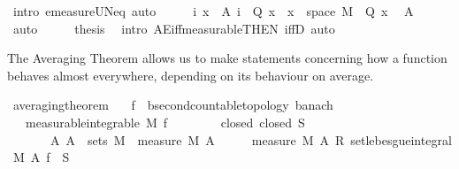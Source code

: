 \begin{isabellebody}
\ {\isacharparenleft}{\kern0pt}intro\ emeasure{\isacharunderscore}{\kern0pt}UN{\isacharunderscore}{\kern0pt}eq{\isacharunderscore}{\kern0pt}{}{\isacharcomma}{\kern0pt}\ auto{\isacharparenright}{\kern0pt}\isanewline
\ \ \isamarkupfalse%
\ \isamarkupfalse%
\ {\isachardoublequoteopen}{\isacharparenleft}{\kern0pt}{\isasymUnion}i{\isachardot}{\kern0pt}\ {\isacharbraceleft}{\kern0pt}x\ {\isasymin}\ A\ i{\isachardot}{\kern0pt}\ {\isasymnot}\ Q\ x{\isacharbraceright}{\kern0pt}{\isacharparenright}{\kern0pt}\ {\isacharequal}{\kern0pt}\ {\isacharbraceleft}{\kern0pt}x\ {\isasymin}\ space\ M{\isachardot}{\kern0pt}\ {\isasymnot}\ Q\ x{\isacharbraceright}{\kern0pt}{\isachardoublequoteclose}\ \isamarkupfalse%
\ A\ \isamarkupfalse%
\ auto\isanewline
\ \ \isamarkupfalse%
\ \isamarkupfalse%
\ {\isacharquery}{\kern0pt}thesis\ \isamarkupfalse%
\ {\isacharparenleft}{\kern0pt}intro\ AE{\isacharunderscore}{\kern0pt}iff{\isacharunderscore}{\kern0pt}measurable{\isacharbrackleft}{\kern0pt}THEN\ iffD{}{\isacharbrackright}{\kern0pt}{\isacharcomma}{\kern0pt}\ auto{\isacharparenright}{\kern0pt}\isanewline
{}\isamarkupfalse%
%
\endisatagproof
{\isafoldproof}%
%
\isadelimproof
%
\endisadelimproof
%
\begin{isamarkuptext}%
The Averaging Theorem allows us to make statements concerning how a function behaves almost everywhere, depending on its behaviour on average.%
\end{isamarkuptext}\isamarkuptrue%
\isamarkupfalse%
\ averaging{\isacharunderscore}{\kern0pt}theorem{\isacharcolon}{\kern0pt}\isanewline
\ \ \ f{\isacharcolon}{\kern0pt}{\isacharcolon}{\kern0pt}{\isachardoublequoteopen}{\isacharunderscore}{\kern0pt}\ {\isasymRightarrow}\ {\isacharprime}{\kern0pt}b{\isacharcolon}{\kern0pt}{\isacharcolon}{\kern0pt}{\isacharbraceleft}{\kern0pt}second{\isacharunderscore}{\kern0pt}countable{\isacharunderscore}{\kern0pt}topology{\isacharcomma}{\kern0pt}\ banach{\isacharbraceright}{\kern0pt}{\isachardoublequoteclose}\isanewline
\ \ \ {\isacharbrackleft}{\kern0pt}measurable{\isacharbrackright}{\kern0pt}{\isacharcolon}{\kern0pt}{\isachardoublequoteopen}integrable\ M\ f{\isachardoublequoteclose}\ \isanewline
\ \ \ \ \ \ \ closed{\isacharcolon}{\kern0pt}\ {\isachardoublequoteopen}closed\ S{\isachardoublequoteclose}\isanewline
\ \ \ \ \ \ \ {\isachardoublequoteopen}{\isasymAnd}A{\isachardot}{\kern0pt}\ A\ {\isasymin}\ sets\ M\ {\isasymLongrightarrow}\ measure\ M\ A\ {\isachargreater}{\kern0pt}\ {}\ {\isasymLongrightarrow}\ {\isacharparenleft}{\kern0pt}{}\ {\isacharslash}{\kern0pt}\ measure\ M\ A{\isacharparenright}{\kern0pt}\ {\isacharasterisk}{\kern0pt}\isactrlsub R\ set{\isacharunderscore}{\kern0pt}lebesgue{\isacharunderscore}{\kern0pt}integral\ M\ A\ f\ {\isasymin}\ S{\isachardoublequoteclose}\isanewline

\end{isabellebody}
